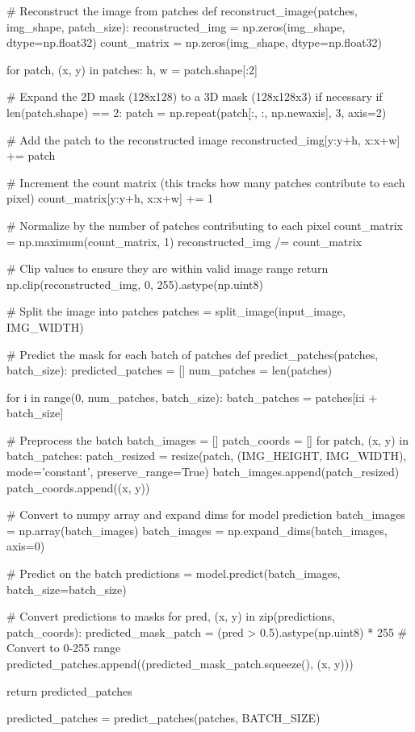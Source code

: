 \documentclass[conference]{IEEEtran}
\begin{document}
# Reconstruct the image from patches
def reconstruct_image(patches, img_shape, patch_size):
reconstructed_img = np.zeros(img_shape, dtype=np.float32)
count_matrix = np.zeros(img_shape, dtype=np.float32)

for patch, (x, y) in patches:
h, w = patch.shape[:2]

# Expand the 2D mask (128x128) to a 3D mask (128x128x3) if necessary
if len(patch.shape) == 2:
patch = np.repeat(patch[:, :, np.newaxis], 3, axis=2)

# Add the patch to the reconstructed image
reconstructed_img[y:y+h, x:x+w] += patch

# Increment the count matrix (this tracks how many patches contribute to each pixel)
count_matrix[y:y+h, x:x+w] += 1

# Normalize by the number of patches contributing to each pixel
count_matrix = np.maximum(count_matrix, 1)
reconstructed_img /= count_matrix

# Clip values to ensure they are within valid image range
return np.clip(reconstructed_img, 0, 255).astype(np.uint8)

# Split the image into patches
patches = split_image(input_image, IMG_WIDTH)

# Predict the mask for each batch of patches
def predict_patches(patches, batch_size):
predicted_patches = []
num_patches = len(patches)

for i in range(0, num_patches, batch_size):
batch_patches = patches[i:i + batch_size]

# Preprocess the batch
batch_images = []
patch_coords = []
for patch, (x, y) in batch_patches:
patch_resized = resize(patch, (IMG_HEIGHT, IMG_WIDTH), mode='constant', preserve_range=True)
batch_images.append(patch_resized)
patch_coords.append((x, y))

# Convert to numpy array and expand dims for model prediction
batch_images = np.array(batch_images)
batch_images = np.expand_dims(batch_images, axis=0)

# Predict on the batch
predictions = model.predict(batch_images, batch_size=batch_size)

# Convert predictions to masks
for pred, (x, y) in zip(predictions, patch_coords):
predicted_mask_patch = (pred > 0.5).astype(np.uint8) * 255  # Convert to 0-255 range
predicted_patches.append((predicted_mask_patch.squeeze(), (x, y)))

return predicted_patches

predicted_patches = predict_patches(patches, BATCH_SIZE)
\end{document}
